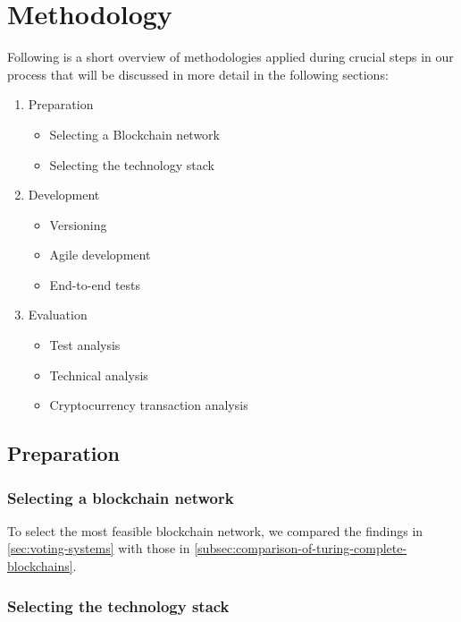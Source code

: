 \chapter{Methodology}\label{ch:methodology}

Following is a short overview of methodologies applied during crucial steps in our process that will be discussed in more detail in the following sections:

\begin{enumerate}
    \item Preparation
    \begin{itemize}
        \item Selecting a \gls{Blockchain} network
        \item Selecting the technology stack
    \end{itemize}
    \item Development
    \begin{itemize}
        \item Versioning
        \item Agile development
        \item End-to-end tests
    \end{itemize}
    \item Evaluation
    \begin{itemize}
        \item Test analysis
        \item Technical analysis
        \item Cryptocurrency transaction analysis
    \end{itemize}
\end{enumerate}

\section{Preparation}\label{sec:preparation}

\subsection{Selecting a blockchain network}\label{subsec:selection-of-blockchain-network2}

To select the most feasible blockchain network, we compared the findings in \cref{sec:voting-systems} with those in \cref{subsec:comparison-of-turing-complete-blockchains}.

\subsection{Selecting the technology stack}\label{subsec:selection-of-technology-stack}


